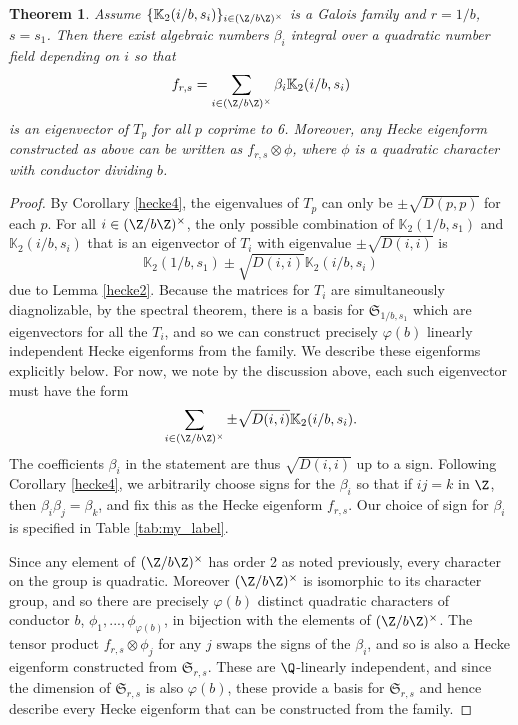 \documentclass[12pt]{amsart}
\newtheorem{theorem}{Theorem}[section]
\theoremstyle{definition}
\theoremstyle{remark}
\begin{document}
\begin{theorem}\label{complete}
      Assume $\{\mathbb{K}_2(i/b,s_i)\}_{i\in (\Z/b\Z)^\times}$ is a Galois family and $r=1/b$, $s=s_1$. Then there exist algebraic numbers $\beta_i$ integral over a quadratic number field depending on $i$ so that $$f_{r,s}=\sum_{i\in (\Z/b\Z)^\times}\beta_i \mathbb{K}_2(i/b,s_i)$$ is an eigenvector of $T_p$ for all $p$ coprime to 6. Moreover, any Hecke eigenform constructed as above can be written as $f_{r,s}\otimes \phi$, where $\phi$ is a quadratic character with conductor dividing $b$. 
\end{theorem}
\begin{proof}
By Corollary \ref{hecke4}, the eigenvalues of $T_p$ can only be $\pm \sqrt{D(p,p)}$ for each $p$. 
For all $i\in (\Z/b\Z)^\times$, the only possible combination of $\mathbb{K}_2(1/b,s_1)$ and $\mathbb{K}_2(i/b,s_i)$ that is an eigenvector of $T_i$ with eigenvalue $\pm\sqrt{D(i,i)}$ is $$\mathbb{K}_2(1/b,s_1)\pm \sqrt{D(i,i)}\mathbb{K}_2(i/b,s_i)$$ due to Lemma \ref{hecke2}. Because the matrices for $T_i$ are simultaneously diagnolizable, by the spectral theorem, there is a basis for $\mathfrak S_{1/b,s_1}$  which are eigenvectors for all the $T_i$, and so we can construct precisely $\varphi(b)$ linearly independent Hecke eigenforms from the family. We describe these eigenforms explicitly below. For now, we note by the discussion above, each such eigenvector must have the form $$\sum_{i\in (\Z/b\Z)^\times}\pm \sqrt{D(i,i)} \mathbb{K}_2(i/b,s_i).$$ The coefficients $\beta_i$ in the statement are thus $\sqrt{D(i,i)}$ up to a sign. Following Corollary \ref{hecke4}, we arbitrarily choose signs for the $\beta_i$ so that if $ij=k$ in $\Z$, then $\beta_i\beta_j=\beta_k$, and fix this as the Hecke eigenform $f_{r,s}$. Our choice of sign for $\beta_i$ is specified in Table \ref{tab:my_label}.

Since any element of $(\Z/b\Z)^\times$ has order 2 as noted previously, every character on the group is quadratic. Moreover $(\Z/b\Z)^\times$ is isomorphic to its character group, and so there are precisely $\varphi(b)$ distinct quadratic characters of conductor $b$, $\phi_1,...,\phi_{\varphi(b)}$, in bijection with the elements of $(\Z/b\Z)^\times$. The tensor product $f_{r,s}\otimes \phi_j$ for any $j$ swaps the signs of the $\beta_i$, and so is also a Hecke eigenform constructed from $\mathfrak{S}_{r,s}$. These are $\Q$-linearly independent, and since the dimension of $\mathfrak{S}_{r,s}$ is also $\varphi(b)$, these provide a basis for $\mathfrak{S}_{r,s}$ and hence describe every Hecke eigenform that can be constructed from the family.
\end{proof}
\end{document}
